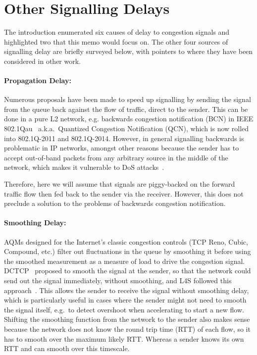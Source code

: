 \section{Other Signalling Delays}\label{sec:other_delays}

The introduction enumerated six causes of delay to congestion signals and highlighted two that this memo would focus on. The other four sources of signalling delay are briefly surveyed below, with pointers to where they have been considered in other work.

\paragraph{Propagation Delay:} Numerous proposals have been made to speed up signalling by sending the signal from the queue back against the flow of traffic, direct to the sender. This can be done in a pure L2 network, e.g. backwards congestion notification (BCN) in IEEE 802.1Qau~\cite{IEEE802.1Qau:Ethernet_QCN} a.k.a.\ Quantized Congestion Notification (QCN), which is now rolled into 802.1Q-2011 and 802.1Q-2014. However, in general signalling backwards is problematic in IP networks, amongst other reasons because the sender has to accept out-of-band packets from any arbitrary source in the middle of the network, which makes it vulnerable to DoS attacks~\cite{IETF_RFC6633:ICMP_SQ_Depr}. 

Therefore, here we will assume that signals are piggy-backed on the forward traffic flow then fed back to the sender via the receiver. However, this does not preclude a solution to the problems of backwards congestion notification.

\paragraph{Smoothing Delay:} AQMs designed for the Internet's classic congestion controls (TCP Reno, Cubic, Compound, etc.) filter out fluctuations in the queue by smoothing it before using the smoothed measurement as a measure of load to drive the congestion signal. DCTCP~\cite{Alizadeh10:DCTCP} proposed to smooth the signal at the sender, so that the network could send out the signal immediately, without smoothing, and L4S followed this approach~\cite{Briscoe16a:l4s-arch_ID}. This allows the sender to receive the signal without smoothing delay, which is particularly useful in cases where the sender might not need to smooth the signal itself, e.g.\ to detect overshoot when accelerating to start a new flow. Shifting the smoothing function from the network to the sender also makes sense because the network does not know the round trip time (RTT) of each flow, so it has to smooth over the maximum likely RTT. Whereas a sender knows its own RTT and can smooth over this timescale.

